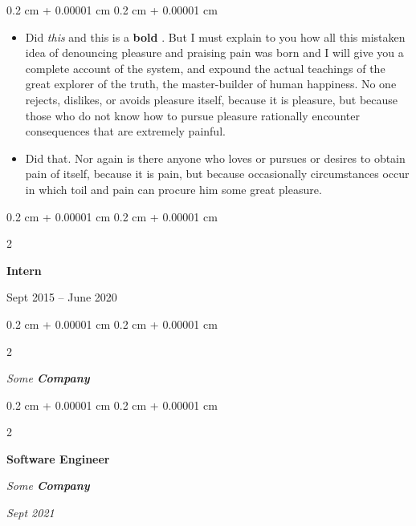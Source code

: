 \documentclass[10pt, letterpaper]{article}
\newenvironment{highlights}{
    \begin{itemize}[
        topsep=0.10 cm,
        parsep=0.10 cm,
        partopsep=0pt,
        itemsep=0pt,
        leftmargin=0.4 cm + 10pt
    ]
}{
    \end{itemize}
} %
\newenvironment{onecolentry}{
    \begin{adjustwidth}{
        0.2 cm + 0.00001 cm
    }{
        0.2 cm + 0.00001 cm
    }
}{
    \end{adjustwidth}
} %
\newenvironment{twocolentry}[2][]{
    \onecolentry
    \def\secondColumn{#2}
    \setcolumnwidth{\fill, 4.5 cm}
    \begin{paracol}{2}
}{
    \switchcolumn \raggedleft \secondColumn
    \end{paracol}
    \endonecolentry
} %
\let\hrefWithoutArrow\href
\renewcommand{\href}[2]{\hrefWithoutArrow{#1}{\ifthenelse{\equal{#2}{}}{ }{#2 }\raisebox{.15ex}{\footnotesize \faExternalLink*}}}
\begin{document}
        \vspace{0.10 cm}
        \begin{onecolentry}
            \begin{highlights}
                \item Did \textit{this} and this is a \textbf{bold} \href{https://example.com}{link}. But I must explain to you how all this mistaken idea of denouncing pleasure and praising pain was born and I will give you a complete account of the system, and expound the actual teachings of the great explorer of the truth, the master-builder of human happiness. No one rejects, dislikes, or avoids pleasure itself, because it is pleasure, but because those who do not know how to pursue pleasure rationally encounter consequences that are extremely painful.
                \item Did that. Nor again is there anyone who loves or pursues or desires to obtain pain of itself, because it is pain, but because occasionally circumstances occur in which toil and pain can procure him some great pleasure.
            \end{highlights}
        \end{onecolentry}


        \vspace{0.2 cm}

                \begin{twocolentry}{
                    Sept 2015 – June 2020
                }
                \textbf{Intern}
                \end{twocolentry}
            \begin{twocolentry}{
            }
            \textit{Some \textbf{Company}}
            \end{twocolentry}



        \vspace{0.2 cm}

            \begin{twocolentry}{


        \textit{Sept 2021}    }
                \textbf{Software Engineer}

                \textit{Some \textbf{Company}}
            \end{twocolentry}
\end{document}
